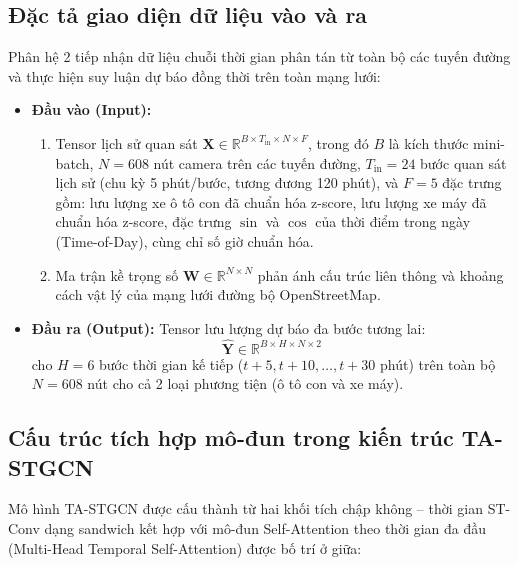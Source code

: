 \subsection{Đặc tả giao diện dữ liệu vào và ra}
Phân hệ 2 tiếp nhận dữ liệu chuỗi thời gian phân tán từ toàn bộ các tuyến đường và thực hiện suy luận dự báo đồng thời trên toàn mạng lưới:
\begin{itemize}
    \item \textbf{Đầu vào (Input):} 
    \begin{enumerate}
        \item Tensor lịch sử quan sát $\mathbf{X} \in \mathbb{R}^{B \times T_{\text{in}} \times N \times F}$, trong đó $B$ là kích thước mini-batch, $N = 608$ nút camera trên các tuyến đường, $T_{\text{in}} = 24$ bước quan sát lịch sử (chu kỳ 5 phút/bước, tương đương 120 phút), và $F = 5$ đặc trưng gồm: lưu lượng xe ô tô con đã chuẩn hóa z-score, lưu lượng xe máy đã chuẩn hóa z-score, đặc trưng $\sin$ và $\cos$ của thời điểm trong ngày (Time-of-Day), cùng chỉ số giờ chuẩn hóa.
        \item Ma trận kề trọng số $\mathbf{W} \in \mathbb{R}^{N \times N}$ phản ánh cấu trúc liên thông và khoảng cách vật lý của mạng lưới đường bộ OpenStreetMap.
    \end{enumerate}
    \item \textbf{Đầu ra (Output):} Tensor lưu lượng dự báo đa bước tương lai:
    \begin{equation}
        \hat{\mathbf{Y}} \in \mathbb{R}^{B \times H \times N \times 2}
    \end{equation}
    cho $H = 6$ bước thời gian kế tiếp ($t+5, t+10, \dots, t+30$ phút) trên toàn bộ $N = 608$ nút cho cả 2 loại phương tiện (ô tô con và xe máy).
\end{itemize}

\subsection{Cấu trúc tích hợp mô-đun trong kiến trúc TA-STGCN}
Mô hình TA-STGCN được cấu thành từ hai khối tích chập không -- thời gian ST-Conv dạng sandwich kết hợp với mô-đun Self-Attention theo thời gian đa đầu (Multi-Head Temporal Self-Attention) được bố trí ở giữa:

